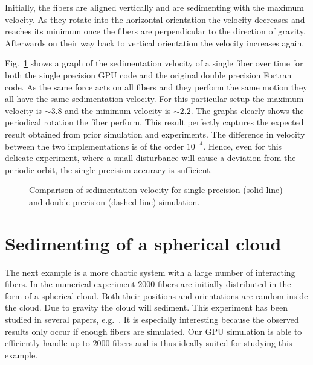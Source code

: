 Initially, the fibers are aligned vertically and are sedimenting with the maximum velocity. As they rotate into the horizontal orientation the velocity decreases and reaches its minimum once the fibers are perpendicular to the direction of gravity. Afterwards on their way back to vertical orientation the velocity increases again.

Fig.~\ref{fig:ring_sedimentation_velocity} shows a graph of the sedimentation velocity of a single fiber over time for both the single precision GPU code and the original double precision Fortran code. As the same force acts on all fibers and they perform the same motion they all have the same sedimentation velocity. For this particular setup the maximum velocity is ${\sim}3.8$ and the minimum velocity is ${\sim}2.2$. The graphs clearly shows the periodical rotation the fiber perform. This result perfectly captures the expected result obtained from prior simulation and experiments. The difference in velocity between the two implementations is of the order $10^{-4}$. Hence, even for this delicate experiment, where a small disturbance will cause a deviation from the periodic orbit, the single precision accuracy is sufficient.

\begin{figure}[!htbp]
  \centering
  \caption[Comparison of sedimentation velocity for single- and double-precision simulation.]{Comparison of sedimentation velocity for single precision (solid line) and double precision (dashed line) simulation.}
  \label{fig:ring_sedimentation_velocity}
\end{figure}

\section{Sedimenting of a spherical cloud}
\label{sec:example_sphere}

The next example is a more chaotic system with a large number of interacting fibers. In the numerical experiment $2000$ fibers are initially distributed in the form of a spherical cloud. Both their positions and orientations are random inside the cloud. Due to gravity the cloud will sediment. This experiment has been studied in several papers, e.g.~\cite{Bulow2015}\cite{Metzger2007}\cite{Park2010}. It is especially interesting because the observed results only occur if enough fibers are simulated. Our GPU simulation is able to efficiently handle up to $2000$ fibers and is thus ideally suited for studying this example.


